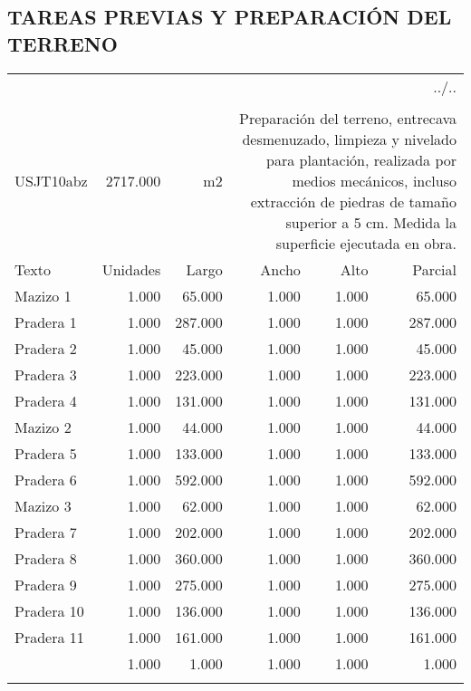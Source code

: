 \documentclass{book}%
\begin{document}
\subsection{TAREAS PREVIAS Y PREPARACIÓN  DEL TERRENO}%
\label{subsec:TAREASPREVIASYPREPARACINDELTERRENO}%
\begin{longtable}{lrrrrr}%
\multicolumn{6}{r}{../..}\\%
\endfoot%
\endlastfoot%
&&&&&\\%
USJT10abz&2717.000& m2&\multicolumn{3}{p{6cm}}{\scriptsize Preparación del terreno, entrecava desmenuzado, limpieza y nivelado para plantación, realizada por medios mecánicos, incluso extracción de piedras de tamaño superior a 5 cm. Medida la superficie ejecutada en obra.\normalsize}\\%
Texto&Unidades&Largo&Ancho&Alto&Parcial\\%
\hline%
\multicolumn{1}{p{3.5cm}}{Mazizo 1}&1.000&65.000&1.000&1.000&65.000\\%
\multicolumn{1}{p{3.5cm}}{Pradera 1}&1.000&287.000&1.000&1.000&287.000\\%
\multicolumn{1}{p{3.5cm}}{Pradera 2}&1.000&45.000&1.000&1.000&45.000\\%
\multicolumn{1}{p{3.5cm}}{Pradera 3}&1.000&223.000&1.000&1.000&223.000\\%
\multicolumn{1}{p{3.5cm}}{Pradera 4}&1.000&131.000&1.000&1.000&131.000\\%
\multicolumn{1}{p{3.5cm}}{Mazizo 2}&1.000&44.000&1.000&1.000&44.000\\%
\multicolumn{1}{p{3.5cm}}{Pradera 5}&1.000&133.000&1.000&1.000&133.000\\%
\multicolumn{1}{p{3.5cm}}{Pradera 6}&1.000&592.000&1.000&1.000&592.000\\%
\multicolumn{1}{p{3.5cm}}{Mazizo 3}&1.000&62.000&1.000&1.000&62.000\\%
\multicolumn{1}{p{3.5cm}}{Pradera 7}&1.000&202.000&1.000&1.000&202.000\\%
\multicolumn{1}{p{3.5cm}}{Pradera 8}&1.000&360.000&1.000&1.000&360.000\\%
\multicolumn{1}{p{3.5cm}}{Pradera 9}&1.000&275.000&1.000&1.000&275.000\\%
\multicolumn{1}{p{3.5cm}}{Pradera 10}&1.000&136.000&1.000&1.000&136.000\\%
\multicolumn{1}{p{3.5cm}}{Pradera 11}&1.000&161.000&1.000&1.000&161.000\\%
\multicolumn{1}{p{3.5cm}}{}&1.000&1.000&1.000&1.000&1.000\\%
&&&&&\\%

\end{longtable}
\end{document}
